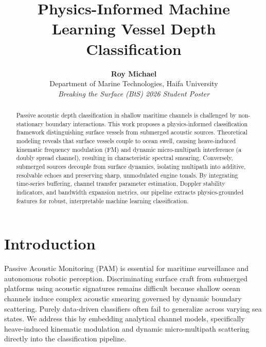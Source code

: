 \documentclass[11pt,a4paper]{article}
\title{\vspace{-8mm}\LARGE\textbf{Physics-Informed Machine Learning Vessel Depth Classification}}
\author{\large\textbf{Roy Michael} \\
\normalsize Department of Marine Technologies, Haifa University \\
\normalsize \textit{Breaking the Surface (BtS) 2026 Student Poster}}
\date{\vspace{-5mm}}
\begin{document}
\maketitle

\begin{abstract}
\normalsize
Passive acoustic depth classification in shallow maritime channels is challenged by non-stationary boundary interactions.
This work proposes a physics-informed classification framework distinguishing surface vessels from submerged acoustic sources.
Theoretical modeling reveals that surface vessels couple to ocean swell, causing heave-induced kinematic frequency modulation (FM) and dynamic micro-multipath interference (a doubly spread channel), resulting in characteristic spectral smearing.
Conversely, submerged sources decouple from surface dynamics, isolating multipath into additive, resolvable echoes and preserving sharp, unmodulated engine tonals.
By integrating time-series buffering, channel transfer parameter estimation, Doppler stability indicators, and bandwidth expansion metrics, our pipeline extracts physics-grounded features for robust, interpretable machine learning classification.
\end{abstract}

\vspace{2mm}

\section{Introduction}
Passive Acoustic Monitoring (PAM) is essential for maritime surveillance and autonomous robotic perception.
Discriminating surface craft from submerged platforms using acoustic signatures remains difficult because shallow ocean channels induce complex acoustic smearing governed by dynamic boundary scattering.
Purely data-driven classifiers often fail to generalize across varying sea states.
We address this by embedding analytical channel models, specifically heave-induced kinematic modulation and dynamic micro-multipath scattering directly into the classification pipeline.
\end{document}
